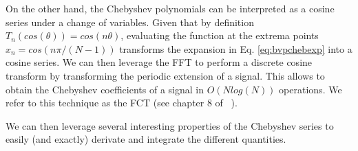 \documentclass[ twoside,openright,titlepage,numbers=noenddot,%
headinclude,footinclude,cleardoublepage=empty,abstract=on,
BCOR=5mm,paper=b5,fontsize=11pt, dvipsnames
]{scrreprt}
\newcommand{\uammd}{\gls{UAMMD}\xspace}
\begin{document}
On the other hand, the Chebyshev polynomials can be interpreted as a cosine series under a change of variables. Given that by definition $T_n(cos(\theta))= cos(n\theta)$, evaluating the function at the extrema points $x_n = cos(n\pi/(N-1))$ transforms the expansion in Eq. \eqref{eq:bvpchebexp} into a cosine series. We can then leverage the \gls{FFT} to perform a discrete cosine transform by transforming the periodic extension of a signal. This allows to obtain the Chebyshev coefficients of a signal in $O(Nlog(N))$ operations. We refer to this technique as the \gls{FCT} (see chapter 8 of ~\cite{Trefethen2000}).

We can then leverage several interesting properties of the Chebyshev series to easily (and exactly) derivate and integrate the different quantities.

\end{document}
